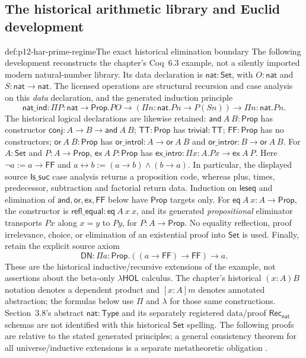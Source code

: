 \subsection{The historical arithmetic library and Euclid development}

\begin{hbdefinition}{def:p12-har-prime-regime}{The exact historical elimination boundary}
The following development reconstructs the chapter's Coq~6.3 example,
not a silently imported modern natural-number library. Its data declaration
is \(\mathsf{nat}:\mathsf{Set}\), with \(O:\mathsf{nat}\) and
\(S:\mathsf{nat}\to\mathsf{nat}\). The licensed operations are
structural recursion and case analysis on this \emph{data} declaration,
and the generated induction principle
\[
 \mathsf{nat\_ind}:\Pi P:\mathsf{nat}\to\mathsf{Prop}.
 P O\to(\Pi n:\mathsf{nat}.P n\to P(S n))\to
 \Pi n:\mathsf{nat}.P n.
\]
The historical logical declarations are likewise retained:
\(\mathsf{and}\ A\ B:\mathsf{Prop}\) has constructor
\(\mathsf{conj}:A\to B\to\mathsf{and}\ A\ B\);
\(\mathsf{TT}:\mathsf{Prop}\) has \(\mathsf{trivial}:\mathsf{TT}\);
\(\mathsf{FF}:\mathsf{Prop}\) has no constructors;
\(\mathsf{or}\ A\ B:\mathsf{Prop}\) has
\(\mathsf{or\_introl}:A\to\mathsf{or}\ A\ B\) and
\(\mathsf{or\_intror}:B\to\mathsf{or}\ A\ B\).
For \(A:\mathsf{Set}\) and \(P:A\to\mathsf{Prop}\),
\(\mathsf{ex}\ A\ P:\mathsf{Prop}\) has
\(\mathsf{ex\_intro}:\Pi x:A.P x\to\mathsf{ex}\ A\ P\).
Here \(\neg a:=a\to\mathsf{FF}\) and
\(a\leftrightarrow b:=(a\to b)\wedge(b\to a)\).
In particular, the displayed source \(\mathsf{Is\_suc}\) case analysis
returns a proposition code, whereas plus, times, predecessor, subtraction
and factorial return data. Induction on \(\mathsf{leseq}\) and elimination
of \(\mathsf{and},\mathsf{or},\mathsf{ex},\mathsf{FF}\) below have
\(\mathsf{Prop}\) targets only. For
\(\mathsf{eq}\ A\ x:\!A\to\mathsf{Prop}\), the constructor is
\(\mathsf{refl\_equal}:\mathsf{eq}\ A\ x\ x\), and its generated
\emph{propositional} eliminator transports \(P x\) along \(x=y\) to
\(P y\), for \(P:A\to\mathsf{Prop}\). No equality reflection,
proof irrelevance, choice, or elimination of an existential proof into
\(\mathsf{Set}\) is used. Finally, retain the explicit source axiom
\[
 \mathsf{DN}:\Pi a:\mathsf{Prop}.((a\to\mathsf{FF})\to\mathsf{FF})\to a.
\]
These are the historical inductive/recursive extensions of the example,
not assertions about the beta-only \(\lambda\mathsf{HOL}\) calculus.
The chapter's historical \((x:A)B\) notation denotes a dependent
product and \([x:A]m\) denotes annotated abstraction; the formulas
below use \(\Pi\) and \(\lambda\) for those same constructions.
Section~3.8's abstract \(\mathsf{nat}:\mathsf{Type}\) and its separately
registered data/proof \(\mathsf{Rec}_{\mathsf{nat}}\) schemas are not
identified with this historical \(\mathsf{Set}\) spelling. The following
proofs are relative to the stated generated principles; a general
consistency theorem for all universe/inductive extensions is a separate
metatheoretic obligation \cite[pp.~1214--1220]{BarendregtGeuvers2001}.
\end{hbdefinition}

